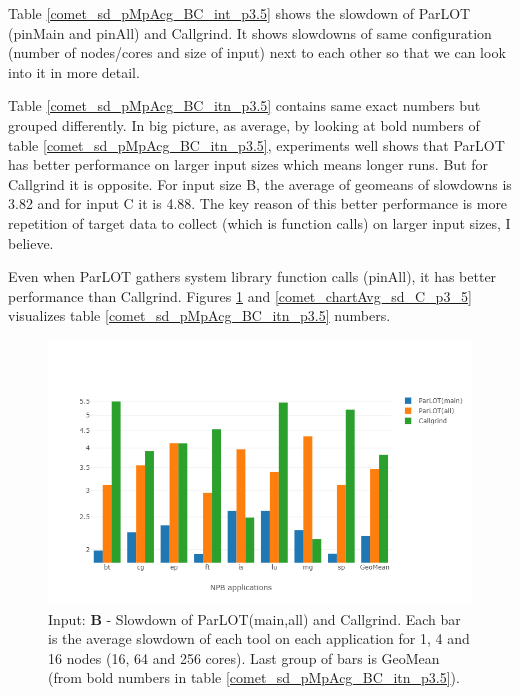 







Table \ref{comet_sd_pMpAcg_BC_int_p3.5} shows the slowdown of ParLOT (pinMain and pinAll) and Callgrind. It shows slowdowns of same configuration (number of nodes/cores and size of input) next to each other so that we can look into it in more detail.


Table \ref{comet_sd_pMpAcg_BC_itn_p3.5} contains same exact numbers but grouped differently. In big picture, as average, by looking at bold numbers of table \ref{comet_sd_pMpAcg_BC_itn_p3.5}, experiments well shows that ParLOT has better performance on larger input sizes which means longer runs. But for Callgrind it is opposite. For input size B, the average of geomeans of slowdowns is 3.82 and for input C it is 4.88. The key reason of this better performance is more repetition of target data to collect (which is function calls) on larger input sizes, I believe. 

Even when ParLOT gathers system library function calls (pinAll), it has better performance than Callgrind. Figures \ref{comet_chartAvg_sd_B_p3_5} and \ref{comet_chartAvg_sd_C_p3_5} visualizes table \ref{comet_sd_pMpAcg_BC_itn_p3.5} numbers.


\begin{figure}[!t]
\centering
\includegraphics[width=6in]{figs.comet/comet_chartAvg_sd_B_p3_5.png}
\caption{ Input: \textbf{B} - Slowdown of ParLOT(main,all) and Callgrind. Each bar is the average slowdown of each tool on each application for 1, 4 and 16 nodes (16, 64 and 256 cores). Last group of bars is GeoMean (from bold numbers in table \ref{comet_sd_pMpAcg_BC_itn_p3.5}). 
}
\label{comet_chartAvg_sd_B_p3_5}
\end{figure}



